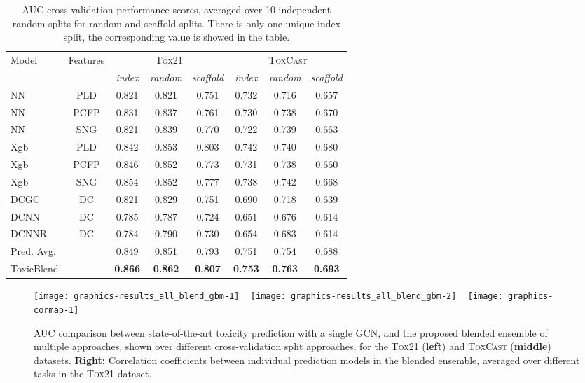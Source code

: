 \documentclass[11pt,a4paper]{article}
\begin{document}
\begin{table}[ht]
\begin{center}
\small
\begin{tabular}{lccccccc}
  \toprule
  {Model} & Features &  \multicolumn{3}{c}{{\textsc{Tox21}}}  &  \multicolumn{3}{c}{{\textsc{ToxCast}}}  \\ 
  \cmidrule(lr){3-5}
  \cmidrule(lr){6-8}
  ~ & ~ & {\emph{index}} & {\emph{random}} & {\emph{scaffold}} & {\emph{index}} & {\emph{random}} & {\emph{scaffold}} \\
  \midrule
    {NN } & {PLD} & 0.821 & 0.821 & 0.751 & 0.732 & 0.716 & 0.657 \\     
    {NN } & {PCFP} & 0.831 & 0.837 & 0.761 & 0.730 & 0.738 & 0.670 \\ 
    {NN } & {SNG} & 0.821 & 0.839 & 0.770 & 0.722 & 0.739 & 0.663 \\ 
    \midrule
    {Xgb} & {PLD} & 0.842 & 0.853 & 0.803 & 0.742 & 0.740 & 0.680 \\ 
    {Xgb} & {PCFP} & 0.846 & 0.852 & 0.773 & 0.731 & 0.738 & 0.660 \\     
    {Xgb} & {SNG} & 0.854 & 0.852 & 0.777 & 0.738 & 0.742 & 0.668 \\ 
  \midrule
  {DCGC } & {DC} & 0.821 & 0.829 & 0.751 & 0.690 & 0.718 & 0.639 \\ 
  {DCNN } & {DC} & 0.785 & 0.787 & 0.724 & 0.651 & 0.676 & 0.614 \\ 
  {DCNNR} & {DC} & 0.784 & 0.790 & 0.730 & 0.654 & 0.683 & 0.614 \\ 
  \midrule
{Pred. Avg.} &  & 0.849 & 0.851 & 0.793 & 0.751 & 0.754 & 0.688\\
  {ToxicBlend} &  & \bf{0.866} & \bf{0.862} & \bf{0.807} & \bf{0.753} & \bf{0.763} & \bf{0.693} \\
  \bottomrule
\end{tabular}
\caption{AUC cross-validation performance scores, averaged over 10 independent
  random splits for random and scaffold splits. There is only one unique index
  split, the corresponding value is showed in the table.} 
\label{tab_results_all_blend}
\end{center}
\end{table}

\begin{figure}[t]
\centering 
\texttt{[image: graphics-results\_all\_blend\_gbm-1]} 
~
\texttt{[image: graphics-results\_all\_blend\_gbm-2]} 
~
\texttt{[image: graphics-cormap-1]} 
  \caption{AUC comparison between state-of-the-art toxicity prediction with a
           single GCN, and the proposed blended ensemble of multiple 
           approaches, shown over different cross-validation split approaches,
           for the \textsc{Tox21} (\textbf{left}) and \textsc{ToxCast} (\textbf{middle})
           datasets. \textbf{Right:} Correlation coefficients between individual 
           prediction models in the blended ensemble, averaged over different 
           tasks in the \textsc{Tox21} dataset.}

\label{fig_all}
\end{figure}
\end{document}
